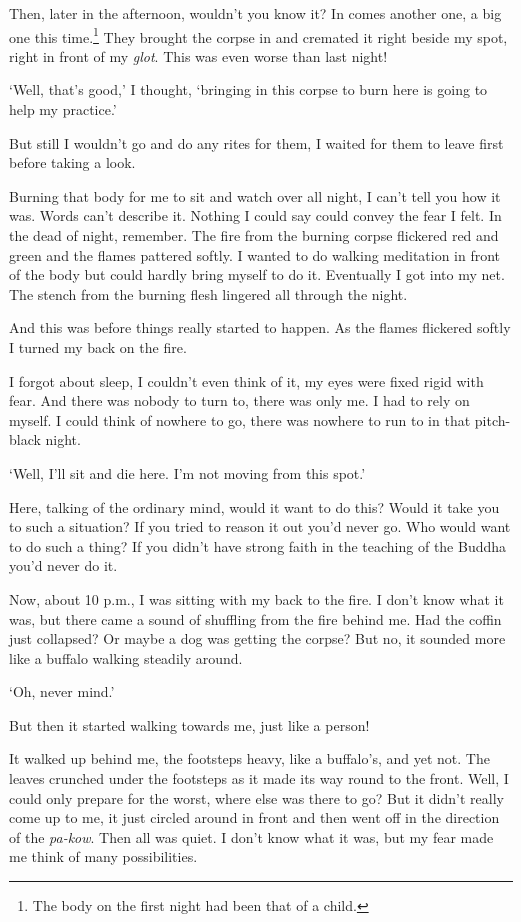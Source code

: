 Then, later in the afternoon, wouldn't you know it? In comes another one, a big one this time.\footnote{The body on the first night had been that of a child.} They brought the corpse in and cremated it right beside my spot, right in front of my \textit{glot}. This was even worse than last night!

`Well, that's good,' I thought, `bringing in this corpse to burn here is going to help my practice.'

But still I wouldn't go and do any rites for them, I waited for them to leave first before taking a look.

Burning that body for me to sit and watch over all night, I can't tell you how it was. Words can't describe it. Nothing I could say could convey the fear I felt. In the dead of night, remember. The fire from the burning corpse flickered red and green and the flames pattered softly. I wanted to do walking meditation in front of the body but could hardly bring myself to do it. Eventually I got into my net. The stench from the burning flesh lingered all through the night.

And this was before things really started to happen. As the flames flickered softly I turned my back on the fire.

I forgot about sleep, I couldn't even think of it, my eyes were fixed rigid with fear. And there was nobody to turn to, there was only me. I had to rely on myself. I could think of nowhere to go, there was nowhere to run to in that pitch-black night.

`Well, I'll sit and die here. I'm not moving from this spot.'

Here, talking of the ordinary mind, would it want to do this? Would it take you to such a situation? If you tried to reason it out you'd never go. Who would want to do such a thing? If you didn't have strong faith in the teaching of the Buddha you'd never do it.

Now, about 10 p.m., I was sitting with my back to the fire. I don't know what it was, but there came a sound of shuffling from the fire behind me. Had the coffin just collapsed? Or maybe a dog was getting the corpse? But no, it sounded more like a buffalo walking steadily around.

`Oh, never mind.'

But then it started walking towards me, just like a person!

It walked up behind me, the footsteps heavy, like a buffalo's, and yet not. The leaves crunched under the footsteps as it made its way round to the front. Well, I could only prepare for the worst, where else was there to go? But it didn't really come up to me, it just circled around in front and then went off in the direction of the \textit{pa-kow}. Then all was quiet. I don't know what it was, but my fear made me think of many possibilities.


